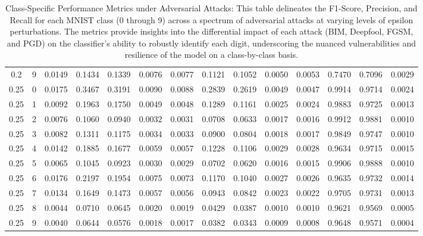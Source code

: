 \documentclass[10pt, conference, a4paper, final]{IEEEtran}
\begin{document}
\begin{table}[ht]
{\begin{tabular}{cccccccccccccc}
        0.2 & 9 & 0.0149 & 0.1434 & 0.1339 & 0.0076 & 0.0077 & 0.1121 & 0.1052 & 0.0050 & 0.0053 & 0.7470 & 0.7096 & 0.0029 \\
        0.25 & 0 & 0.0175 & 0.3467 & 0.3191 & 0.0090 & 0.0088 & 0.2839 & 0.2619 & 0.0049 & 0.0047 & 0.9914 & 0.9714 & 0.0024 \\
        0.25 & 1 & 0.0092 & 0.1963 & 0.1750 & 0.0049 & 0.0048 & 0.1289 & 0.1161 & 0.0025 & 0.0024 & 0.9883 & 0.9725 & 0.0013 \\
        0.25 & 2 & 0.0076 & 0.1060 & 0.0940 & 0.0032 & 0.0031 & 0.0708 & 0.0633 & 0.0017 & 0.0016 & 0.9912 & 0.9881 & 0.0010 \\
        0.25 & 3 & 0.0082 & 0.1311 & 0.1175 & 0.0034 & 0.0033 & 0.0900 & 0.0804 & 0.0018 & 0.0017 & 0.9849 & 0.9747 & 0.0010 \\
        0.25 & 4 & 0.0142 & 0.1885 & 0.1677 & 0.0059 & 0.0057 & 0.1228 & 0.1106 & 0.0029 & 0.0028 & 0.9634 & 0.9715 & 0.0015 \\
        0.25 & 5 & 0.0065 & 0.1045 & 0.0923 & 0.0030 & 0.0029 & 0.0702 & 0.0620 & 0.0016 & 0.0015 & 0.9906 & 0.9888 & 0.0010 \\
        0.25 & 6 & 0.0176 & 0.2197 & 0.1954 & 0.0075 & 0.0073 & 0.1170 & 0.1040 & 0.0027 & 0.0026 & 0.9635 & 0.9732 & 0.0014 \\
        0.25 & 7 & 0.0134 & 0.1649 & 0.1473 & 0.0057 & 0.0056 & 0.0943 & 0.0842 & 0.0023 & 0.0022 & 0.9705 & 0.9731 & 0.0013 \\
        0.25 & 8 & 0.0044 & 0.0710 & 0.0645 & 0.0020 & 0.0019 & 0.0429 & 0.0387 & 0.0010 & 0.0010 & 0.9621 & 0.9569 & 0.0005 \\
        0.25 & 9 & 0.0040 & 0.0644 & 0.0576 & 0.0018 & 0.0017 & 0.0382 & 0.0343 & 0.0009 & 0.0008 & 0.9648 & 0.9571 & 0.0004 \\              
        \bottomrule
    \end{tabular}
    }
    \caption{Class-Specific Performance Metrics under Adversarial Attacks: This table delineates the F1-Score, Precision, and Recall for each MNIST class (0 through 9) across a spectrum of adversarial attacks at varying levels of epsilon perturbations. The metrics provide insights into the differential impact of each attack (BIM, Deepfool, FGSM, and PGD) on the classifier's ability to robustly identify each digit, underscoring the nuanced vulnerabilities and resilience of the model on a class-by-class basis.}

    \label{table2}
    \end{table}
\end{document}

